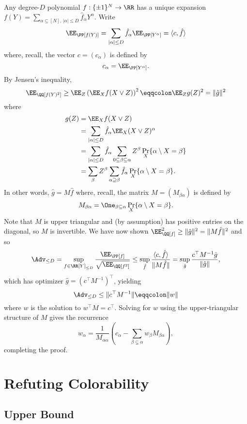 \documentclass{article}
\begin{document}
Any degree-$D$ polynomial $f: \{\pm 1\}^N \to \RR$ has a unique expansion $f(Y) = \sum_{\alpha \subseteq [N],\,|\alpha| \le D} \hat{f}_\alpha Y^\alpha$. Write
\[ \EE_\PP[f(Y)] = \sum_{|\alpha| \le D} \hat{f}_\alpha \EE_\PP[Y^\alpha] = \langle c,\hat f \rangle \]
where, recall, the vector $c = (c_\alpha)$ is defined by
\[ c_\alpha = \EE_\PP[Y^\alpha]. \]
By Jensen's inequality,
\[ \EE_\QQ[f(Y)^2] \ge \EE_Z \left(\EE_X f(X \vee Z)\right)^2 \eqqcolon \EE_Z g(Z)^2 = \|\hat{g}\|^2 \]
where
\begin{align*}
g(Z) &= \EE_X f(X \vee Z) \\
&= \sum_{|\alpha| \le D} \hat{f}_\alpha \EE_X (X \vee Z)^\alpha \\
&= \sum_{|\alpha| \le D} \hat{f}_\alpha \sum_{0 \subseteq \beta \subseteq \alpha} Z^\beta \Pr_X\{\alpha \setminus X = \beta\} \\
&= \sum_\beta Z^\beta \sum_{\alpha \supseteq \beta} \hat{f}_\alpha \Pr_X\{\alpha \setminus X = \beta\}.
\end{align*}
In other words, $\hat{g} = M \hat{f}$ where, recall, the matrix $M = (M_{\beta\alpha})$ is defined by
\[ M_{\beta\alpha} = \One_{\beta \subseteq \alpha} \Pr_X\{\alpha \setminus X = \beta\}. \]
Note that $M$ is upper triangular and (by assumption) has positive entries on the diagonal, so $M$ is invertible. We have now shown $\EE_\QQ[f]^2 \ge \|\hat g\|^2 = \|M\hat f\|^2$ and so
\[ \Adv_{\le D} = \sup_{f \in \RR[Y]_{\le D}} \frac{\EE_\PP[f]}{\sqrt{\EE_\QQ[f^2]}} \le \sup_{\hat f} \frac{\langle c,\hat f \rangle}{\|M \hat f\|} = \sup_{\hat g} \frac{c^\top M^{-1} \hat g}{\|\hat g\|}, \]
which has optimizer $\hat g = (c^\top M^{-1})^\top$, yielding
\[ \Adv_{\le D} \le \|c^\top M^{-1}\| \eqqcolon \|w\| \]
where $w$ is the solution to $w^\top M = c^\top$. Solving for $w$ using the upper-triangular structure of $M$ gives the recurrence
\begin{equation}\label{eq:w-recurrence}
w_\alpha = \frac{1}{M_{\alpha\alpha}} \left(c_\alpha - \sum_{\beta \subsetneq \alpha} w_\beta M_{\beta\alpha}\right),
\end{equation}
completing the proof.




\section{Refuting Colorability}\label{sec:ref-hardness}


\subsection{Upper Bound}
\end{document}
